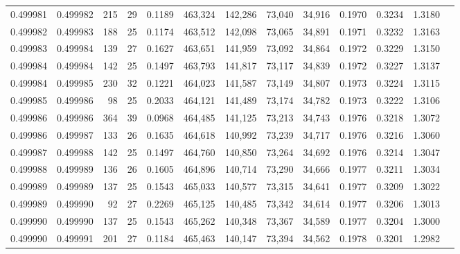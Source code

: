\begin{tabular}{rrrrrrrrrrrrr}
0.499981 & 0.499982 & 215 &  29 &                                     0.1189 & 463,324 & 142,286 &  73,040 &  34,916 & 0.1970 & 0.3234 & 1.3180 \\
0.499982 & 0.499983 & 188 &  25 &                                     0.1174 & 463,512 & 142,098 &  73,065 &  34,891 & 0.1971 & 0.3232 & 1.3163 \\
0.499983 & 0.499984 & 139 &  27 &                                     0.1627 & 463,651 & 141,959 &  73,092 &  34,864 & 0.1972 & 0.3229 & 1.3150 \\
0.499984 & 0.499984 & 142 &  25 &                                     0.1497 & 463,793 & 141,817 &  73,117 &  34,839 & 0.1972 & 0.3227 & 1.3137 \\
0.499984 & 0.499985 & 230 &  32 &                                     0.1221 & 464,023 & 141,587 &  73,149 &  34,807 & 0.1973 & 0.3224 & 1.3115 \\
0.499985 & 0.499986 &  98 &  25 &                                     0.2033 & 464,121 & 141,489 &  73,174 &  34,782 & 0.1973 & 0.3222 & 1.3106 \\
0.499986 & 0.499986 & 364 &  39 &                                     0.0968 & 464,485 & 141,125 &  73,213 &  34,743 & 0.1976 & 0.3218 & 1.3072 \\
0.499986 & 0.499987 & 133 &  26 &                                     0.1635 & 464,618 & 140,992 &  73,239 &  34,717 & 0.1976 & 0.3216 & 1.3060 \\
0.499987 & 0.499988 & 142 &  25 &                                     0.1497 & 464,760 & 140,850 &  73,264 &  34,692 & 0.1976 & 0.3214 & 1.3047 \\
0.499988 & 0.499989 & 136 &  26 &                                     0.1605 & 464,896 & 140,714 &  73,290 &  34,666 & 0.1977 & 0.3211 & 1.3034 \\
0.499989 & 0.499989 & 137 &  25 &                                     0.1543 & 465,033 & 140,577 &  73,315 &  34,641 & 0.1977 & 0.3209 & 1.3022 \\
0.499989 & 0.499990 &  92 &  27 &                                     0.2269 & 465,125 & 140,485 &  73,342 &  34,614 & 0.1977 & 0.3206 & 1.3013 \\
0.499990 & 0.499990 & 137 &  25 &                                     0.1543 & 465,262 & 140,348 &  73,367 &  34,589 & 0.1977 & 0.3204 & 1.3000 \\
0.499990 & 0.499991 & 201 &  27 &                                     0.1184 & 465,463 & 140,147 &  73,394 &  34,562 & 0.1978 & 0.3201 & 1.2982 \\

\end{tabular}
